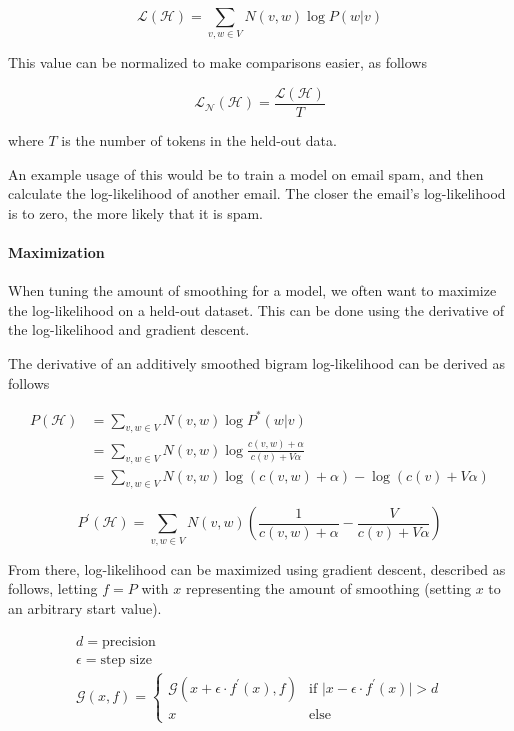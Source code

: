 \documentclass[11pt]{article}
\begin{document}
$$ \mathcal{L}\left(\mathcal{H}\right) = \sum\limits_{v, w \in V} N\left(v, w \right) \log P\left(w \vert v \right) $$

This value can be normalized to make comparisons easier, as follows

$$ \mathcal{L}_\mathcal{N}\left(\mathcal{H}\right) = \frac{ \mathcal{L}\left(\mathcal{H}\right) }{T} $$

where $T$ is the number of tokens in the held-out data.

An example usage of this would be to train a model on email spam, and then calculate the log-likelihood of another email. The closer the email's log-likelihood is to zero, the more likely that it is spam.

\paragraph{Maximization}

When tuning the amount of smoothing for a model, we often want to maximize the log-likelihood on a held-out dataset. This can be done using the derivative of the log-likelihood and gradient descent.

The derivative of an additively smoothed bigram log-likelihood can be derived as follows

\begin{align}
P\left(\mathcal{H}\right) &= \sum\limits_{v, w \in V} N\left(v, w\right) \log P^*\left(w \vert v\right) \\
&= \sum\limits_{v, w \in V} N\left(v, w\right) \log \frac{c\left(v, w\right) + \alpha}{c\left(v\right) + V\alpha} \\
&= \sum\limits_{v, w \in V} N\left(v, w\right) \log\left(c\left(v, w\right) + \alpha\right) - \log\left( c\left(v\right) + V\alpha \right)
\end{align}

$$ P^\prime\left(\mathcal{H}\right) = \sum\limits_{v, w \in V} N\left(v, w\right) \left(\frac{1}{c\left(v, w\right) + \alpha} - \frac{V}{c\left(v\right) + V\alpha }\right) $$

From there, log-likelihood can be maximized using gradient descent, described as follows, letting $f = P$ with $x$ representing the amount of smoothing (setting $x$ to an arbitrary start value).

\begin{gather*}
d = \text{precision} \\
\epsilon = \text{step size} \\
\mathcal{G}\left(x, f \right) =
\begin{cases}
\mathcal{G}\left(x + \epsilon \cdot f^\prime\left(x\right), f \right) & \text{if } \vert x - \epsilon \cdot f^\prime\left(x\right) \vert > d \\
x & \text{else}
\end{cases}
\end{gather*}
\end{document}
